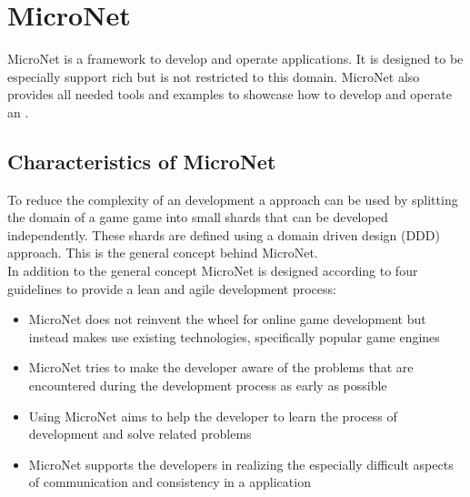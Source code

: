 \section{MicroNet}

MicroNet is a framework to develop and operate \ms{} applications. It is
designed to be especially support rich \ogs{} but is not restricted to this
domain. MicroNet also provides all needed tools and examples to showcase how to
develop and operate an \og{}.

\subsection{Characteristics of MicroNet}

To reduce the complexity of an \og{} development a \ms{} approach can be used by
splitting the domain of a game game into small shards that can be developed
independently. These shards are defined using a domain driven design (DDD)
approach. This is the general concept behind MicroNet.\\

In addition to the general concept MicroNet is designed according to four
guidelines to provide a lean and agile \og{} development process:
\begin{itemize}
  \item MicroNet does not reinvent the wheel for online game development but
  instead makes use existing technologies, specifically popular game engines
  \item MicroNet tries to make the developer aware of the problems that are
  encountered during the development process as early as possible
  
  \item Using MicroNet aims to help the developer to learn the process of \og{}
  development and solve related problems
  \item MicroNet supports the developers in realizing the especially
  difficult aspects of communication and consistency in a \ms{} application
\end{itemize}







 

